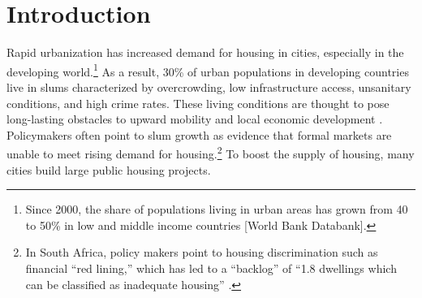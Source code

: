 \documentclass[12pt]{article}
\begin{document}
\begin{titlepage}
\begin{abstract}

\bigskip
\end{abstract}
\setcounter{page}{0}
\thispagestyle{empty}
\end{titlepage}
\pagebreak \newpage

\section{Introduction} \label{sec:introduction}




Rapid urbanization has increased demand for housing in cities, especially in the developing world.\footnote{Since 2000, the share of populations living in urban areas has grown from 40 to 50\% in low and middle income countries [World Bank Databank].}  As a result, 30\% of urban populations in developing countries live in slums characterized by overcrowding, low infrastructure access, unsanitary conditions, and high crime rates. These living conditions are thought to pose long-lasting obstacles to upward mobility and local economic development \citep{marx2013slums}.  Policymakers often point to slum growth as evidence that formal markets are unable to meet rising demand for housing.\footnote{In South Africa, policy makers point to housing discrimination such as financial ``red lining,'' which has led to a ``backlog'' of ``1.8 dwellings which can be classified as inadequate housing'' \citep{bng}.}  To boost the supply of housing, many cities build large public housing projects. %
\end{document}
